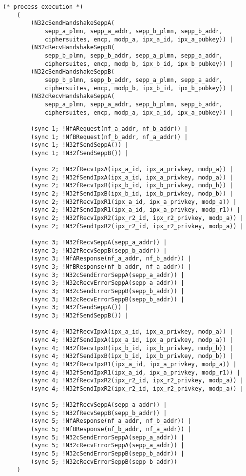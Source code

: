 \begin{lstlisting}[caption={Definition of the main process},label={lst:main-proc},firstnumber=1183]
    (* process execution *)
    (
        (N32cSendHandshakeSeppA(
            sepp_a_plmn, sepp_a_addr, sepp_b_plmn, sepp_b_addr,
            ciphersuites, encp, modp_a, ipx_a_id, ipx_a_pubkey)) |
        (N32cRecvHandshakeSeppB(
            sepp_b_plmn, sepp_b_addr, sepp_a_plmn, sepp_a_addr,
            ciphersuites, encp, modp_b, ipx_b_id, ipx_b_pubkey)) |
        (N32cSendHandshakeSeppB(
            sepp_b_plmn, sepp_b_addr, sepp_a_plmn, sepp_a_addr,
            ciphersuites, encp, modp_b, ipx_b_id, ipx_b_pubkey)) |
        (N32cRecvHandshakeSeppA(
            sepp_a_plmn, sepp_a_addr, sepp_b_plmn, sepp_b_addr,
            ciphersuites, encp, modp_a, ipx_a_id, ipx_a_pubkey)) |

        (sync 1; !NfARequest(nf_a_addr, nf_b_addr)) |
        (sync 1; !NfBRequest(nf_b_addr, nf_a_addr)) |
        (sync 1; !N32fSendSeppA()) |
        (sync 1; !N32fSendSeppB()) |

        (sync 2; !N32fRecvIpxA(ipx_a_id, ipx_a_privkey, modp_a)) |
        (sync 2; !N32fSendIpxA(ipx_a_id, ipx_a_privkey, modp_a)) |
        (sync 2; !N32fRecvIpxB(ipx_b_id, ipx_b_privkey, modp_b)) |
        (sync 2; !N32fSendIpxB(ipx_b_id, ipx_b_privkey, modp_b)) |
        (sync 2; !N32fRecvIpxR1(ipx_a_id, ipx_a_privkey, modp_a)) |
        (sync 2; !N32fSendIpxR1(ipx_a_id, ipx_a_privkey, modp_r1)) |
        (sync 2; !N32fRecvIpxR2(ipx_r2_id, ipx_r2_privkey, modp_a)) |
        (sync 2; !N32fSendIpxR2(ipx_r2_id, ipx_r2_privkey, modp_a)) |

        (sync 3; !N32fRecvSeppA(sepp_a_addr)) |
        (sync 3; !N32fRecvSeppB(sepp_b_addr)) |
        (sync 3; !NfAResponse(nf_a_addr, nf_b_addr)) |
        (sync 3; !NfBResponse(nf_b_addr, nf_a_addr)) |
        (sync 3; !N32cSendErrorSeppA(sepp_a_addr)) |
        (sync 3; !N32cRecvErrorSeppA(sepp_a_addr)) |
        (sync 3; !N32cSendErrorSeppB(sepp_b_addr)) |
        (sync 3; !N32cRecvErrorSeppB(sepp_b_addr)) |
        (sync 3; !N32fSendSeppA()) |
        (sync 3; !N32fSendSeppB()) |

        (sync 4; !N32fRecvIpxA(ipx_a_id, ipx_a_privkey, modp_a)) |
        (sync 4; !N32fSendIpxA(ipx_a_id, ipx_a_privkey, modp_a)) |
        (sync 4; !N32fRecvIpxB(ipx_b_id, ipx_b_privkey, modp_b)) |
        (sync 4; !N32fSendIpxB(ipx_b_id, ipx_b_privkey, modp_b)) |
        (sync 4; !N32fRecvIpxR1(ipx_a_id, ipx_a_privkey, modp_a)) |
        (sync 4; !N32fSendIpxR1(ipx_a_id, ipx_a_privkey, modp_r1)) |
        (sync 4; !N32fRecvIpxR2(ipx_r2_id, ipx_r2_privkey, modp_a)) |
        (sync 4; !N32fSendIpxR2(ipx_r2_id, ipx_r2_privkey, modp_a)) |

        (sync 5; !N32fRecvSeppA(sepp_a_addr)) |
        (sync 5; !N32fRecvSeppB(sepp_b_addr)) |
        (sync 5; !NfAResponse(nf_a_addr, nf_b_addr)) |
        (sync 5; !NfBResponse(nf_b_addr, nf_a_addr)) |
        (sync 5; !N32cSendErrorSeppA(sepp_a_addr)) |
        (sync 5; !N32cRecvErrorSeppA(sepp_a_addr)) |
        (sync 5; !N32cSendErrorSeppB(sepp_b_addr)) |
        (sync 5; !N32cRecvErrorSeppB(sepp_b_addr))
    )
\end{lstlisting}